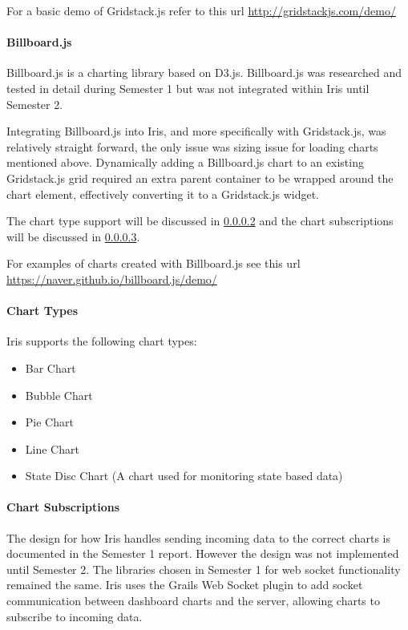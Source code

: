 \documentclass[12pt,a4paper,titlepage]{report}
\begin{document}
For a basic demo of Gridstack.js refer to this url \url{http://gridstackjs.com/demo/}

\paragraph{Billboard.js}

Billboard.js is a charting library based on D3.js. Billboard.js was researched and tested in detail during Semester 1 but was not integrated within Iris until Semester 2.

Integrating Billboard.js into Iris, and more specifically with Gridstack.js, was relatively straight forward, the only issue was sizing issue for loading charts mentioned above.  
Dynamically adding a Billboard.js chart to an existing Gridstack.js grid required an extra parent container to be wrapped around the chart element, effectively converting it to a Gridstack.js widget.

The chart type support will be discussed in \cref{para:charts:fontend} and the chart subscriptions will be discussed in \cref{para:charts:subs:frontend}.

For examples of charts created with Billboard.js see this url \url{https://naver.github.io/billboard.js/demo/}

\paragraph{Chart Types}

\label{para:charts:fontend}
Iris supports the following chart types:
\begin{itemize}
    \item Bar Chart
    \item Bubble Chart
    \item Pie Chart
    \item Line Chart
    \item State Disc Chart (A chart used for monitoring state based data)
\end{itemize}

\paragraph{Chart Subscriptions}\label{para:charts:subs:frontend}

The design for how Iris handles sending incoming data to the correct charts is documented in the Semester 1 report. However the design was not implemented until Semester 2. The libraries chosen in Semester 1 for web socket functionality remained the same. Iris uses the Grails Web Socket plugin to add socket communication between dashboard charts and the server, allowing charts to subscribe to incoming data. 
\end{document}
